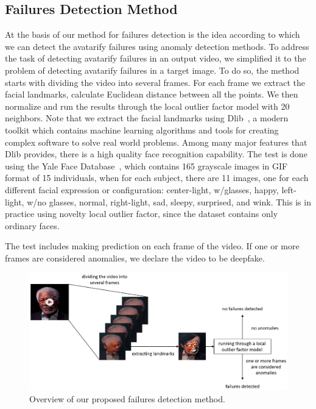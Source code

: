 \documentclass[english,12pt]{article}
\begin{document}
\subsection{Failures Detection Method}
At the basis of our method for failures detection is the idea according to which we can detect
the avatarify failures using anomaly detection methods. To address the task of detecting avatarify
failures in an output video, we simplified it to the problem of detecting avatarify failures in a
target image. To do so, the method starts with dividing the video into several frames.
For each frame we extract the facial landmarks, calculate Euclidean distance between all the points.
We then normalize and run the results through the local outlier factor model with 20 neighbors.
Note that we extract the facial landmarks using Dlib~\cite{Dlib, github}, a modern toolkit which contains machine learning
algorithms and tools for creating complex software to solve real world problems. Among many major features
that Dlib provides, there is a high quality face recognition capability.
The test is done using the Yale Face Database~\cite{Yale}, which contains 165 grayscale images in GIF format of
15 individuals, when for each subject, there are 11 images, one for each different facial expression or
configuration: center-light, w/glasses, happy, left-light, w/no glasses, normal, right-light, sad, sleepy,
surprised, and wink. This is in practice using novelty local outlier factor, since the dataset contains only ordinary faces.

The test includes making prediction on each frame of the video. If one or more frames are considered anomalies,
we declare the video to be deepfake.\\

\begin{figure}[htb]
  \begin{centering}
      \includegraphics[scale=0.34]{images/our.PNG}
  \par\end{centering}
  \caption{\label{fig:method}Overview of our proposed failures detection method.}
\end{figure}
\end{document}
